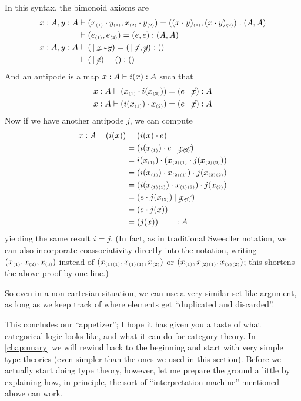 \begin{props}
In this syntax, the bimonoid axioms are
\begin{align*}
  x:A,y:A &\vdash (x_{\scriptscriptstyle(1)}\cdot y_{\scriptscriptstyle(1)},x_{\scriptscriptstyle(2)}\cdot y_{\scriptscriptstyle(2)}) = ((x\cdot y)_{\scriptscriptstyle(1)},(x\cdot y)_{\scriptscriptstyle(2)}) :(A,A)\\
          &\vdash (e_{\scriptscriptstyle(1)},e_{\scriptscriptstyle(2)})=(e,e):(A,A)\\
  x:A,y:A &\vdash (\,\mid\cancel{x\cdot y}) = (\,\mid\cancel{x},\cancel{y}) : ()\\
  &\vdash (\,\mid\cancel{e})=():()
\end{align*}
And an antipode is a map $x:A \vdash i(x):A$ such that
\begin{align*}
  x:A &\vdash (x_{\scriptscriptstyle(1)}\cdot i(x_{\scriptscriptstyle(2)})) = (e\mid\cancel{x}) :A\\
  x:A &\vdash (i(x_{\scriptscriptstyle(1)})\cdot x_{\scriptscriptstyle(2)}) = (e\mid\cancel{x}) :A
\end{align*}
Now if we have another antipode $j$, we can compute
\begin{align*}
  x:A \vdash (i(x))
  &= (i(x)\cdot e)\\
  &= (i(x_{\scriptscriptstyle(1)})\cdot e\mid\cancel{x_{\scriptscriptstyle(2)}})\\
  &= i(x_{\scriptscriptstyle(1)})\cdot (x_{\scriptscriptstyle(2)}{}_{\scriptscriptstyle(1)} \cdot j(x_{\scriptscriptstyle(2)}{}_{\scriptscriptstyle(2)}))\\
  &= (i(x_{\scriptscriptstyle(1)})\cdot x_{\scriptscriptstyle(2)}{}_{\scriptscriptstyle(1)}) \cdot j(x_{\scriptscriptstyle(2)}{}_{\scriptscriptstyle(2)})\\
  &= (i(x_{\scriptscriptstyle(1)}{}_{\scriptscriptstyle(1)})\cdot x_{\scriptscriptstyle(1)}{}_{\scriptscriptstyle(2)}) \cdot j(x_{\scriptscriptstyle(2)})\\
  &= (e \cdot j(x_{\scriptscriptstyle(2)})\mid\cancel{x_{\scriptscriptstyle(1)}})\\
  &= (e\cdot j(x))\\
  &= (j(x)) \qquad :A
\end{align*}
yielding the same result $i=j$.
(In fact, as in traditional Sweedler notation, we can also incorporate coassociativity directly into the notation, writing $(x_{\scriptscriptstyle(1)},x_{\scriptscriptstyle(2)},x_{\scriptscriptstyle(3)})$ instead of $(x_{\scriptscriptstyle(1)}{}_{\scriptscriptstyle(1)},x_{\scriptscriptstyle(1)}{}_{\scriptscriptstyle(1)},x_{\scriptscriptstyle(2)})$ or $(x_{\scriptscriptstyle(1)},x_{\scriptscriptstyle(2)}{}_{\scriptscriptstyle(1)},x_{\scriptscriptstyle(2)}{}_{\scriptscriptstyle(2)})$; this shortens the above proof by one line.)

So even in a non-cartesian situation, we can use a very similar set-like argument, as long as we keep track of where elements get ``duplicated and discarded''.
\end{props}

This concludes our ``appetizer''; I hope it has given you a taste of what categorical logic looks like, and what it can do for category theory.
In \cref{chap:unary} we will rewind back to the beginning and start with very simple type theories (even simpler than the ones we used in this section).
Before we actually start doing type theory, however, let me prepare the ground a little by explaining how, in principle, the sort of ``interpretation machine'' mentioned above can work.



